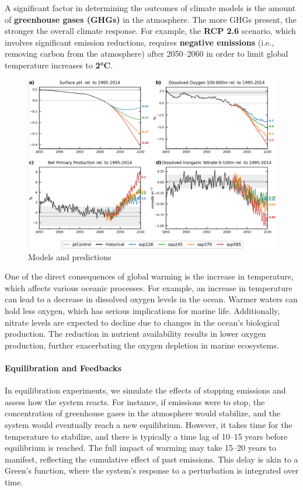 A significant factor in determining the outcomes of climate models is the amount of \textbf{greenhouse gases (GHGs)} in the atmosphere. The more GHGs present, the stronger the overall climate response. For example, the \textbf{RCP 2.6} scenario, which involves significant emission reductions, requires \textbf{negative emissions} (i.e., removing carbon from the atmosphere) after 2050–2060 in order to limit global temperature increases to \textbf{2°C}.
\begin{figure}[htpb]
    \centering
    \includegraphics[width=0.5\linewidth]{uploads/predictions.png}
    \caption{Models and predictions}
    
\end{figure}

One of the direct consequences of global warming is the increase in temperature, which affects various oceanic processes. For example, an increase in temperature can lead to a decrease in dissolved oxygen levels in the ocean. Warmer waters can hold less oxygen, which has serious implications for marine life. Additionally, nitrate levels are expected to decline due to changes in the ocean's biological production. The reduction in nutrient availability results in lower oxygen production, further exacerbating the oxygen depletion in marine ecosystems.

\paragraph{Equilibration and Feedbacks}

In equilibration experiments, we simulate the effects of stopping emissions and assess how the system reacts. For instance, if emissions were to stop, the concentration of greenhouse gases in the atmosphere would stabilize, and the system would eventually reach a new equilibrium. However, it takes time for the temperature to stabilize, and there is typically a time lag of 10–15 years before equilibrium is reached. The full impact of warming may take 15–20 years to manifest, reflecting the cumulative effect of past emissions. This delay is akin to a Green's function, where the system's response to a perturbation is integrated over time.


